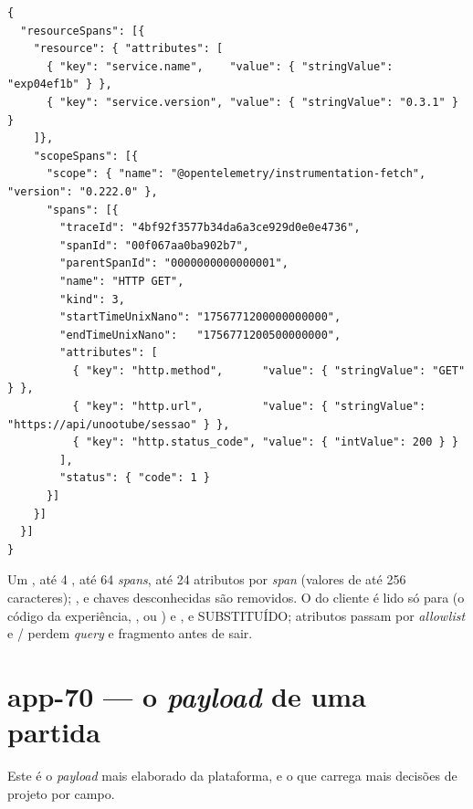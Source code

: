 \begin{lstlisting}[language=jsonunoo, caption={\rota{POST /observabilidade/v1/traces} --- subconjunto OTLP/JSON}]
{
  "resourceSpans": [{
    "resource": { "attributes": [
      { "key": "service.name",    "value": { "stringValue": "exp04ef1b" } },
      { "key": "service.version", "value": { "stringValue": "0.3.1" } }
    ]},
    "scopeSpans": [{
      "scope": { "name": "@opentelemetry/instrumentation-fetch", "version": "0.222.0" },
      "spans": [{
        "traceId": "4bf92f3577b34da6a3ce929d0e0e4736",
        "spanId": "00f067aa0ba902b7",
        "parentSpanId": "0000000000000001",
        "name": "HTTP GET",
        "kind": 3,
        "startTimeUnixNano": "1756771200000000000",
        "endTimeUnixNano":   "1756771200500000000",
        "attributes": [
          { "key": "http.method",      "value": { "stringValue": "GET" } },
          { "key": "http.url",         "value": { "stringValue": "https://api/unootube/sessao" } },
          { "key": "http.status_code", "value": { "intValue": 200 } }
        ],
        "status": { "code": 1 }
      }]
    }]
  }]
}
\end{lstlisting}

Um , até 4 , até 64 \emph{spans}, até 24
atributos por \emph{span} (valores de até 256 caracteres); ,
 e chaves desconhecidas são removidos. O  do
cliente é lido só para  (o código da experiência, , ou ) e
, e SUBSTITUÍDO; atributos passam por \emph{allowlist} e
/ perdem \emph{query} e fragmento antes de sair.

\section{app-70 --- o \emph{payload} de uma partida}

Este é o \emph{payload} mais elaborado da plataforma, e o que carrega mais
decisões de projeto por campo.

